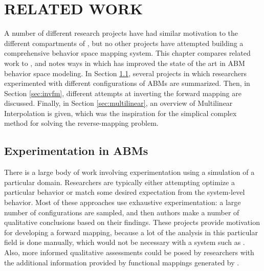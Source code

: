 \chapter{RELATED WORK}
\thispagestyle{plain}

\label{RelatedWork}

A number of different research projects have had similar motivation to the different compartments of \fw, but no other projects have attempted building a comprehensive behavior space mapping system.
This chapter compares related work to \fw, and notes ways in which \fw has improved the state of the art in ABM behavior space modeling.
In Section \ref{sec:abmexp}, several projects in which researchers experimented with different configurations of ABMs are summarized.
Then, in Section \ref{sec:invfm}, different attempts at inverting the forward mapping are discussed.
Finally, in Section \ref{sec:multilinear}, an overview of Multilinear Interpolation is given, which was the inspiration for the simplical complex method for solving the reverse-mapping problem.

\section{Experimentation in ABMs}
\label{sec:abmexp}

There is a large body of work involving experimentation using a simulation of a particular domain.
Researchers are typically either attempting optimize a particular behavior or match some desired expectation from the system-level behavior.
Most of these approaches use exhaustive experimentation: a large number of configurations are sampled, and then authors make a number of qualitative conclusions based on their findings.
These projects provide motivation for developing a forward mapping, because a lot of the analysis in this particular field is done manually, which would not be necessary with a system such as \fw.
Also, more informed qualitative assessments could be posed by researchers with the additional information provided by functional mappings generated by \fw.

